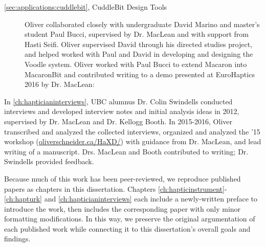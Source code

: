 \begin{description}


\item[\autoref{sec:applications:cuddlebit}, CuddleBit Design Tools] Oliver collaborated closely with undergraduate David Marino and master's student Paul Bucci, supervised by Dr. MacLean and with support from Hasti Seifi.
Oliver supervised David through his directed studies project, and helped worked with Paul and David in developing and designing the Voodle system.
Oliver worked with Paul Bucci to extend Macaron into MacaronBit and contributed writing to a demo presented at EuroHaptics 2016 by Dr. MacLean:


\end{description}

\noindent
In \autoref{ch:hapticianinterviews}, UBC alumnus Dr. Colin Swindells conducted interviews and developed interview notes and initial analysis ideas in 2012, supervised by Dr. MacLean and Dr. Kellogg Booth.
In 2015-2016, Oliver transcribed and analyzed the collected interviews, organized and analyzed the \haxd '15 workshop (\url{oliverschneider.ca/HaXD/}) with guidance from Dr. MacLean, and lead writing of a manuscript.
Drs. MacLean and Booth contributed to writing; Dr. Swindells provided feedback.

Because much of this work has been peer-reviewed, we reproduce published papers as chapters in this dissertation.
Chapters \ref{ch:hapticinstrument}-\ref{ch:hapturk} and \ref{ch:hapticianinterviews} each include a newly-written preface to introduce the work, then includes the corresponding paper with only minor formatting modifications.
In this way, we preserve the original argumentation of each published work while connecting it to this dissertation's overall goals and findings.




